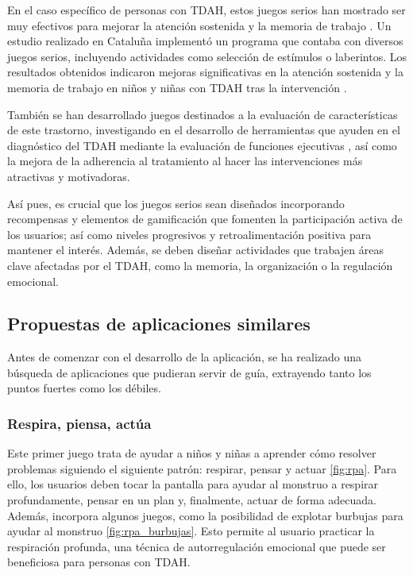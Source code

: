 En el caso específico de personas con TDAH, estos juegos serios han mostrado ser muy efectivos para mejorar la atención sostenida y la memoria de trabajo \parencite{games_adhd_2021} \parencite{games_adhd_2025} \parencite{games_adhd_sf}.
Un estudio realizado en Cataluña implementó un programa que contaba con diversos juegos serios, incluyendo actividades como selección de estímulos o laberintos.
Los resultados obtenidos indicaron mejoras significativas en la atención sostenida y la memoria de trabajo en niños y niñas con TDAH tras la intervención \parencite{redalyc2019}.

También se han desarrollado juegos destinados a la evaluación de características de este trastorno, investigando en el desarrollo de herramientas que ayuden en el diagnóstico del TDAH mediante la evaluación de funciones ejecutivas \parencite{pmc2014},
así como la mejora de la adherencia al tratamiento al hacer las intervenciones más atractivas y motivadoras.

Así pues, es crucial que los juegos serios sean diseñados incorporando recompensas y elementos de gamificación que fomenten la participación activa de los usuarios; así como niveles progresivos y retroalimentación positiva para mantener el interés. Además, se deben diseñar actividades que trabajen áreas clave afectadas por el TDAH, como la memoria, la organización o la regulación emocional.

\subsection{Propuestas de aplicaciones similares}
Antes de comenzar con el desarrollo de la aplicación, se ha realizado una búsqueda de aplicaciones que pudieran servir de guía, extrayendo tanto los puntos fuertes como los débiles.

\subsubsection{Respira, piensa, actúa}
Este primer juego \parencite{rpa} trata de ayudar a niños y niñas a aprender cómo resolver problemas siguiendo el siguiente patrón: respirar, pensar y actuar \cref{fig:rpa}. 
Para ello, los usuarios deben tocar la pantalla para ayudar al monstruo a respirar profundamente, pensar en un plan y, finalmente, actuar de forma adecuada. 
Además, incorpora algunos juegos, como la posibilidad de explotar burbujas para ayudar al monstruo \cref{fig:rpa_burbujas}.
Esto permite al usuario practicar la respiración profunda, una técnica de autorregulación emocional que puede ser beneficiosa para personas con TDAH.

